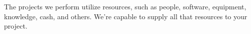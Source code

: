 The projects we perform utilize resources, such as people, software,
equipment, knowledge, cash, and others. We're capable to supply
all that resources to your project.
